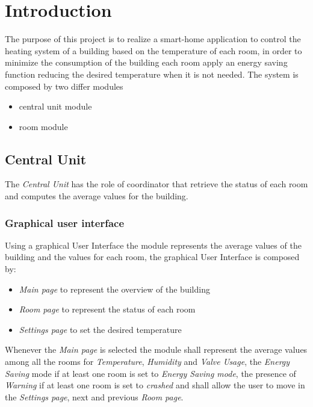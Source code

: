 \section{Introduction}
The purpose of this project is to realize a smart-home application to control the heating system of a building based on the temperature of each room, in order to minimize the consumption of the building each room apply an energy saving function reducing the desired temperature when it is not needed.
The system is composed by two differ modules
\begin{itemize}
	\item central unit module 
	\item room module
\end{itemize}

\subsection{Central Unit}
The \textit{Central Unit} has the role of coordinator that retrieve the status of each room and computes the average values for the building.\\

\subsubsection{Graphical user interface}
Using a graphical User Interface the module represents the average values of the building and the values for each room, the graphical User Interface is composed by:
\begin{itemize}
	\item \textit{Main page} to represent the overview of the building
	\item \textit{Room page} to represent the status of each room
	\item \textit{Settings page} to set the desired temperature
\end{itemize}

Whenever the \textit{Main page} is selected the module shall represent the average values among all the rooms for \textit{Temperature}, \textit{Humidity} and \textit{Valve Usage}, 
the \textit{Energy Saving} mode if at least one room is set to \textit{Energy Saving mode}, the presence of \textit{Warning} if at least one room is set to \textit{crashed} 
and shall allow the user to move in the \textit{Settings page}, next and previous \textit{Room page}.\\


